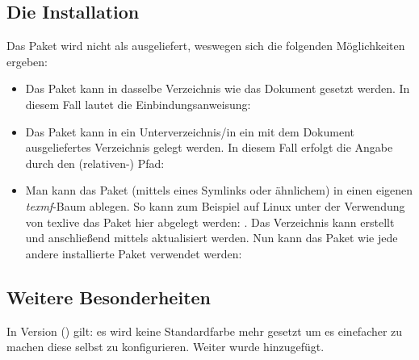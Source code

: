 \documentclass{sopra-base}
\begin{document}
\subsection{Die Installation}
    Das Paket wird nicht als  ausgeliefert, weswegen sich die
    folgenden Möglichkeiten ergeben:
    \begin{itemize}
        \item Das Paket kann in dasselbe Verzeichnis wie das Dokument
                gesetzt werden. In diesem Fall lautet die Einbindungsanweisung:
\begin{plainlatex}
\usepackage{sopra-attachments}
\end{plainlatex}
        \item Das Paket kann in ein Unterverzeichnis/in ein mit
                dem Dokument ausgeliefertes Verzeichnis gelegt werden. In
                diesem Fall erfolgt die Angabe durch den (relativen-) Pfad:
\begin{plainlatex}
\usepackage{./Mein/Pfad/zu/sopra-attachments}
\end{plainlatex}
        \item Man kann das Paket (mittels eines Symlinks oder ähnlichem)
              in einen eigenen \emph{texmf}-Baum ablegen.
              So kann zum Beispiel auf Linux unter der Verwendung von texlive
              das Paket hier abgelegt werden: .
              Das Verzeichnis kann erstellt und anschließend mittels
               aktualisiert werden. Nun kann
              das Paket wie jede andere installierte Paket verwendet werden:
\begin{plainlatex}
\usepackage{sopra-attachments}
\end{plainlatex}
    \end{itemize}

\subsection{Weitere Besonderheiten}
In Version \thesoaversion{} () gilt: es wird keine Standardfarbe mehr gesetzt um es einefacher zu machen diese selbst zu konfigurieren. Weiter wurde  hinzugefügt.

%
%
%
%
\end{document}
